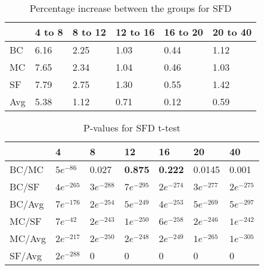 \begin{table}[H]
	\centering
	\begin{tabular}{|l|lllll|}\hline
		& 4 to 8 & 8 to 12 & 12 to 16 & 16 to 20 & 20 to 40 \\ \hline
		BC 	& 6.16	& 2.25	& 1.03	& 0.44	& 1.12 \\
		MC  & 7.65	& 2.34	& 1.04	& 0.46	& 1.03 \\
		SF  & 7.79	& 2.75	& 1.30	& 0.55	& 1.42 \\
		Avg	& 5.38	& 1.12	& 0.71	& 0.12	& 0.59 \\ \hline
	\end{tabular}
	\caption{Percentage increase between the groups for SFD}
	\label{tbl:sfd}
\end{table}

\begin{table}[H]
	\centering
	\begin{tabular}{|l|llllll|}\hline
		& 4 & 8 & 12 & 16 & 20 & 40 \\\hline
		BC/MC	& $5e^{-86}$	& 0.027	& \textbf{0.875}	& \textbf{0.222}	& 0.0145 & 0.001 \\
		BC/SF	& $4e^{-265}$	& $3e^{-288}$	& $7e^{-295}$	& $2e^{-274}$	& $3e^{-277}$ & $2e^{-275}$ \\
		BC/Avg	& $7e^{-176}$	& $2e^{-254}$	& $5e^{-249}$	& $4e^{-253}$	& $5e^{-269}$ & $5e^{-297}$ \\
		MC/SF	& $7e^{-42}$	& $2e^{-243}$ 	& $1e^{-250}$	& $6e^{-258}$	& $2e^{-246}$ & $1e^{-242}$ \\
		MC/Avg	& $2e^{-217}$	& $2e^{-250}$ 	& $2e^{-248}$	& $2e^{-249}$	& $1e^{-265}$ & $1e^{-305}$ \\
		SF/Avg	& $2e^{-288}$	& 0	& 0	& 0	& 0 & 0 \\ \hline
	\end{tabular}
	\caption{P-values for SFD t-test}
	\label{tbl:sfd_ttest}
\end{table}
